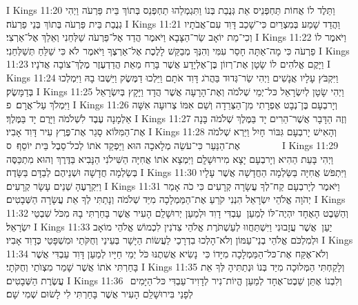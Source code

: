I Kings 11:20	וַתֵּלֶד לוֹ אֲחוֹת תַּחְפְּנֵיס אֵת גְּנֻבַת בְּנוֹ וַתִּגְמְלֵהוּ תַחְפְּנֵס בְּתוֹךְ בֵּית פַּרְעֹה וַיְהִי גְנֻבַת בֵּית פַּרְעֹה בְּתוֹךְ בְּנֵי פַרְעֹה׃
I Kings 11:21	וַהֲדַד שָׁמַע בְּמִצְרַיִם כִּי־שָׁכַב דָּוִד עִם־אֲבֹתָיו וְכִי־מֵת יוֹאָב שַׂר־הַצָּבָא וַיֹּאמֶר הֲדַד אֶל־פַּרְעֹה שַׁלְּחֵנִי וְאֵלֵךְ אֶל־אַרְצִי׃
I Kings 11:22	וַיֹּאמֶר לוֹ פַרְעֹה כִּי מָה־אַתָּה חָסֵר עִמִּי וְהִנְּךָ מְבַקֵּשׁ לָלֶכֶת אֶל־אַרְצֶךָ וַיֹּאמֶר  לֹא כִּי שַׁלֵּחַ תְּשַׁלְּחֵנִי׃
I Kings 11:23	וַיָּקֶם אֱלֹהִים לוֹ שָׂטָן אֶת־רְזוֹן בֶּן־אֶלְיָדָע אֲשֶׁר בָּרַח מֵאֵת הֲדַדְעֶזֶר מֶלֶךְ־צוֹבָה אֲדֹנָיו׃
I Kings 11:24	וַיִּקְבֹּץ עָלָיו אֲנָשִׁים וַיְהִי שַׂר־גְּדוּד בַּהֲרֹג דָּוִד אֹתָם וַיֵּלְכוּ דַמֶּשֶׂק וַיֵּשְׁבוּ בָהּ וַיִּמְלְכוּ בְּדַמָּשֶׂק׃
I Kings 11:25	וַיְהִי שָׂטָן לְיִשְׂרָאֵל כּל־יְמֵי שְׁלֹמֹה וְאֶת־הָרָעָה אֲשֶׁר הֲדָד וַיָּקָץ בְּיִשְׂרָאֵל וַיִּמְלֹךְ עַל־אֲרָם׃ {פ}
I Kings 11:26	וְיָרבְעָם בֶּן־נְבָט אֶפְרָתִי מִן־הַצְּרֵדָה וְשֵׁם אִמּוֹ צְרוּעָה אִשָּׁה אַלְמָנָה עֶבֶד לִשְׁלֹמֹה וַיָּרֶם יָד בַּמֶּלֶךְ׃
I Kings 11:27	וְזֶה הַדָּבָר אֲשֶׁר־הֵרִים יָד בַּמֶּלֶךְ שְׁלֹמֹה בָּנָה אֶת־הַמִּלּוֹא סָגַר אֶת־פֶּרֶץ עִיר דָּוִד אָבִיו׃
I Kings 11:28	וְהָאִישׁ יָרבְעָם גִּבּוֹר חָיִל וַיַּרְא שְׁלֹמֹה אֶת־הַנַּעַר כִּי־עֹשֵׂה מְלָאכָה הוּא וַיַּפְקֵד אֹתוֹ לְכל־סֵבֶל בֵּית יוֹסֵף׃ {ס}        
I Kings 11:29	וַיְהִי בָּעֵת הַהִיא וְיָרבְעָם יָצָא מִירוּשָׁלָ͏ִם וַיִּמְצָא אֹתוֹ אֲחִיָּה הַשִּׁילֹנִי הַנָּבִיא בַּדֶּרֶךְ וְהוּא מִתְכַּסֶּה בְּשַׂלְמָה חֲדָשָׁה וּשְׁנֵיהֶם לְבַדָּם בַּשָּׂדֶה׃
I Kings 11:30	וַיִּתְפֹּשׂ אֲחִיָּה בַּשַּׂלְמָה הַחֲדָשָׁה אֲשֶׁר עָלָיו וַיִּקְרָעֶהָ שְׁנֵים עָשָׂר קְרָעִים׃
I Kings 11:31	וַיֹּאמֶר לְיָרבְעָם קַח־לְךָ עֲשָׂרָה קְרָעִים כִּי כֹה אָמַר יְהֹוָה אֱלֹהֵי יִשְׂרָאֵל הִנְנִי קֹרֵעַ אֶת־הַמַּמְלָכָה מִיַּד שְׁלֹמֹה וְנָתַתִּי לְךָ אֵת עֲשָׂרָה הַשְּׁבָטִים׃
I Kings 11:32	וְהַשֵּׁבֶט הָאֶחָד יִהְיֶה־לּוֹ לְמַעַן  עַבְדִּי דָוִד וּלְמַעַן יְרוּשָׁלַ͏ִם הָעִיר אֲשֶׁר בָּחַרְתִּי בָהּ מִכֹּל שִׁבְטֵי יִשְׂרָאֵל׃
I Kings 11:33	יַעַן  אֲשֶׁר עֲזָבוּנִי וַיִּשְׁתַּחֲווּ לְעַשְׁתֹּרֶת אֱלֹהֵי צִדֹנִין לִכְמוֹשׁ אֱלֹהֵי מוֹאָב וּלְמִלְכֹּם אֱלֹהֵי בְנֵי־עַמּוֹן וְלֹא־הָלְכוּ בִדְרָכַי לַעֲשׂוֹת הַיָּשָׁר בְּעֵינַי וְחֻקֹּתַי וּמִשְׁפָּטַי כְּדָוִד אָבִיו׃
I Kings 11:34	וְלֹא־אֶקַּח אֶת־כּל־הַמַּמְלָכָה מִיָּדוֹ כִּי  נָשִׂיא אֲשִׁתֶנּוּ כֹּל יְמֵי חַיָּיו לְמַעַן דָּוִד עַבְדִּי אֲשֶׁר בָּחַרְתִּי אֹתוֹ אֲשֶׁר שָׁמַר מִצְוֺתַי וְחֻקֹּתָי׃
I Kings 11:35	וְלָקַחְתִּי הַמְּלוּכָה מִיַּד בְּנוֹ וּנְתַתִּיהָ לְּךָ אֵת עֲשֶׂרֶת הַשְּׁבָטִים׃
I Kings 11:36	וְלִבְנוֹ אֶתֵּן שֵׁבֶט־אֶחָד לְמַעַן הֱיוֹת־נִיר לְדָוִיד־עַבְדִּי כּל־הַיָּמִים  לְפָנַי בִּירוּשָׁלַ͏ִם הָעִיר אֲשֶׁר בָּחַרְתִּי לִי לָשׂוּם שְׁמִי שָׁם׃
